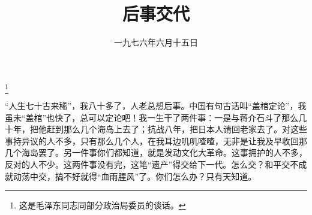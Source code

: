 
\title{后事交代}
\date{一九七六年六月十五日}
\thanks{这是毛泽东同志同部分政治局委员的谈话。}
\maketitle


“人生七十古来稀”，我八十多了，人老总想后事。中国有句古话叫“盖棺定论”，我虽未“盖棺”也快了，总可以定论吧！我一生干了两件事：一是与蒋介石斗了那么几十年，把他赶到那么几个海岛上去了；抗战八年，把日本人请回老家去了。对这些事持异议的人不多，只有那么几个人，在我耳边叽叽喳喳，无非是让我及早收回那几个海岛罢了。另一件事你们都知道，就是发动文化大革命。这事拥护的人不多，反对的人不少。这两件事没有完，这笔“遗产”得交给下一代。怎么交？和平交不成就动荡中交，搞不好就得“血雨腥风”了。你们怎么办？只有天知道。

